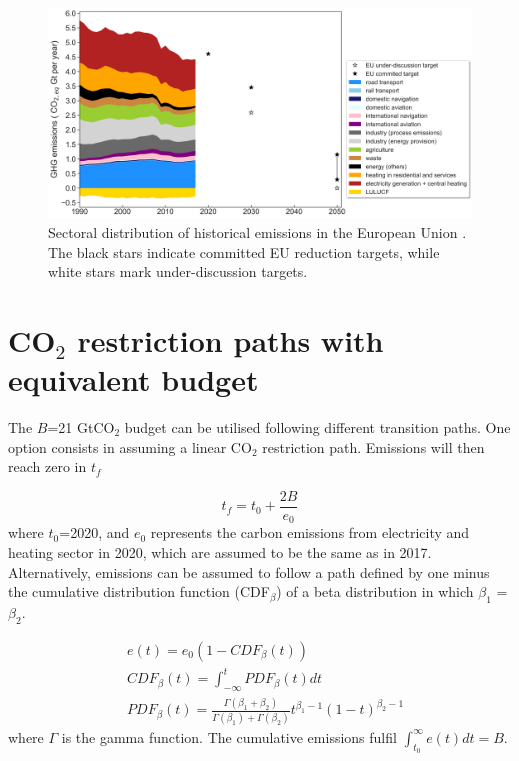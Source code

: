 \documentclass[3p]{elsarticle} %
\begin{document}
\begin{figure}[!h]
\centering
\includegraphics[width=\textwidth]{figures/historical_sectoral_emissions.png}
\caption{Sectoral distribution of historical emissions in the European Union \cite{UNFCCC_inventory}. The black stars indicate committed EU reduction targets, while white stars mark under-discussion targets.} \label{fig_historical_emissions} 
\end{figure}

\section{CO$_2$ restriction paths with equivalent budget}

The $B$=21 GtCO$_2$ budget can be utilised following different transition paths. One option consists in assuming a linear CO$_2$ restriction path. Emissions will then reach zero in $t_f$

\begin{equation}
	t_f=t_0+\frac{2B}{e_0}
\end{equation}
where $t_0$=2020, and $e_0$ represents the carbon emissions from electricity and heating sector in 2020, which are assumed to be the same as in 2017. \\

Alternatively, emissions can be assumed to follow a path defined by one minus the cumulative distribution function (CDF$_\beta$) of a beta distribution in which $\beta_1$ = $\beta_2$. 

\begin{equation}
\begin{aligned}
&	e (t) = e_0(1- CDF_{\beta}(t)) \\
&	CDF_{\beta} (t) =\int_{-\infty}^{t} PDF_{\beta}(t) dt \\
&	PDF_{\beta} (t) =  \frac{\Gamma(\beta_1+\beta_2)}{\Gamma(\beta_1)+\Gamma(\beta_2)} t^{\beta_1-1} (1-t)^{\beta_2-1}
\end{aligned}
\end{equation}
where $\Gamma$ is the gamma function. The cumulative emissions fulfil $\int_{t_0}^{\infty} e(t) dt =B$. \\
\end{document}
